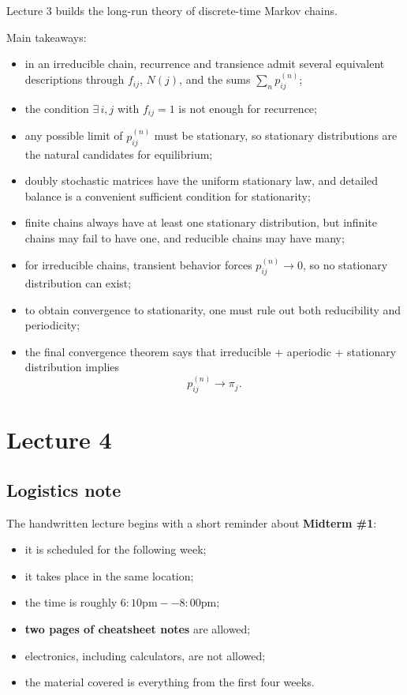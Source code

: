 \documentclass[11pt]{article}
\theoremstyle{definition}
\begin{document}
\begin{summarybox}
Lecture 3 builds the long-run theory of discrete-time Markov chains.

Main takeaways:
\begin{itemize}[leftmargin=2em]
    \item in an irreducible chain, recurrence and transience admit several equivalent descriptions through \(f_{ij}\), \(N(j)\), and the sums \(\sum_n p_{ij}^{(n)}\);
    \item the condition \(\exists\, i,j\) with \(f_{ij}=1\) is not enough for recurrence;
    \item any possible limit of \(p_{ij}^{(n)}\) must be stationary, so stationary distributions are the natural candidates for equilibrium;
    \item doubly stochastic matrices have the uniform stationary law, and detailed balance is a convenient sufficient condition for stationarity;
    \item finite chains always have at least one stationary distribution, but infinite chains may fail to have one, and reducible chains may have many;
    \item for irreducible chains, transient behavior forces \(p_{ij}^{(n)}\to 0\), so no stationary distribution can exist;
    \item to obtain convergence to stationarity, one must rule out both reducibility and periodicity;
    \item the final convergence theorem says that irreducible + aperiodic + stationary distribution implies
    \[
    p_{ij}^{(n)}\to \pi_j.
    \]
\end{itemize}
\end{summarybox}

\clearpage


\clearpage

\section{Lecture 4}

\subsection{Logistics note}

The handwritten lecture begins with a short reminder about \textbf{Midterm \#1}:
\begin{itemize}[leftmargin=2em]
    \item it is scheduled for the following week;
    \item it takes place in the same location;
    \item the time is roughly \(6{:}10\text{pm}--8{:}00\text{pm}\);
    \item \textbf{two pages of cheatsheet notes} are allowed;
    \item electronics, including calculators, are not allowed;
    \item the material covered is everything from the first four weeks.
\end{itemize}
\end{document}
